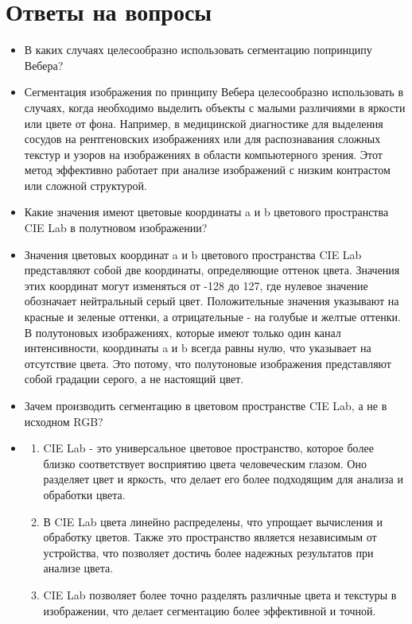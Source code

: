 \section{Ответы на вопросы}

\setcounter{question}{0}

\newcommand{\question}[1]{\item[Q\refstepcounter{question}\thequestion.] #1}
\newcommand{\answer}[1]{\item[A\thequestion.] #1}

\begin{itemize}

\question{В каких случаях целесообразно использовать сегментацию попринципу Вебера?}
\answer{Сегментация изображения по принципу Вебера целесообразно использовать в случаях, когда необходимо выделить объекты с малыми различиями в яркости или цвете от фона. Например, в медицинской диагностике для выделения сосудов на рентгеновских изображениях или для распознавания сложных текстур и узоров на изображениях в области компьютерного зрения. Этот метод эффективно работает при анализе изображений с низким контрастом или сложной структурой.}

\question{Какие значения имеют цветовые координаты a и b цветового пространства CIE Lab в полутновом изображении?}
\answer{Значения цветовых координат a и b цветового пространства CIE Lab представляют собой две координаты, определяющие оттенок цвета. Значения этих координат могут изменяться от -128 до 127, где нулевое значение обозначает нейтральный серый цвет. Положительные значения указывают на красные и зеленые оттенки, а отрицательные - на голубые и желтые оттенки.
В полутоновых изображениях, которые имеют только один канал интенсивности, координаты a и b всегда равны нулю, что указывает на отсутствие цвета. Это потому, что полутоновые изображения представляют собой градации серого, а не настоящий цвет.}

\question{Зачем производить сегментацию в цветовом пространстве CIE Lab, а не в исходном RGB?}
\answer{
\begin{enumerate}
Сегментация в цветовом пространстве CIE Lab предпочтительнее, чем в RGB, по следующим причинам:
\item CIE Lab - это универсальное цветовое пространство, которое более близко соответствует восприятию цвета человеческим глазом. Оно разделяет цвет и яркость, что делает его более подходящим для анализа и обработки цвета.
\item В CIE Lab цвета линейно распределены, что упрощает вычисления и обработку цветов. Также это пространство является независимым от устройства, что позволяет достичь более надежных результатов при анализе цвета.
\item CIE Lab позволяет более точно разделять различные цвета и текстуры в изображении, что делает сегментацию более эффективной и точной.


\end{enumerate}}
\end{itemize}
